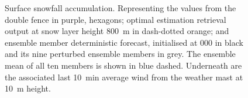 \begin{figure}[t!]
\begin{subfigure}[t]{0.49\textwidth}
		\caption{}\label{fig:sfc_acc26}
	\end{subfigure}
	\caption{Surface snowfall accumulation. Representing the values from the double fence in purple, hexagons; optimal estimation retrieval output at snow layer height \SI{800}{\metre} in dash-dotted orange; and ensemble member deterministic forecast, initialised at 0\SI{00}{\UTC} in black and its nine perturbed ensemble members in grey. The ensemble mean of all ten members is shown in blue dashed.  Underneath are the associated last \SI{10}{\minute} average wind from the weather mast at \SI{10}{\metre} height. }\label{fig:sfc_acc}
\end{figure}


